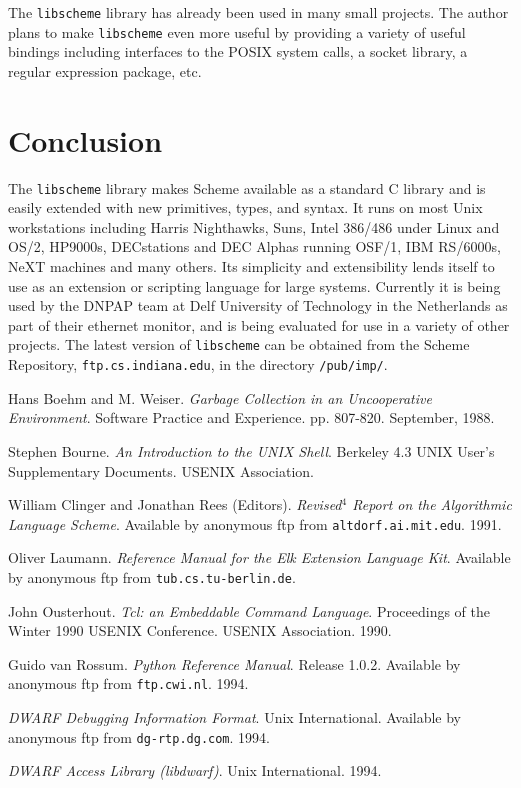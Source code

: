 The \verb+libscheme+ library has already been used in many small
projects.  The author plans to make \verb+libscheme+ even more useful
by providing a variety of useful bindings including interfaces to the
POSIX system calls, a socket library, a regular expression package,
etc.

\section{Conclusion}

The \verb+libscheme+ library makes Scheme available as a standard C
library and is easily extended with new primitives, types, and syntax.
It runs on most Unix workstations including Harris Nighthawks, Suns,
Intel 386/486 under Linux and OS/2, HP9000s, DECstations and DEC
Alphas running OSF/1, IBM RS/6000s, NeXT machines and many others.
Its simplicity and extensibility lends itself to use as an extension
or scripting language for large systems.  Currently it is being used
by the DNPAP team at Delf University of Technology in the Netherlands
as part of their ethernet monitor, and is being evaluated for use in a
variety of other projects.  The latest version of \verb+libscheme+ can
be obtained from the Scheme Repository, \verb+ftp.cs.indiana.edu+, in
the directory \verb+/pub/imp/+.

\begin{thebibliography}{99}

 Hans Boehm and M. Weiser.  {\em Garbage Collection
    in an Uncooperative Environment\/}.  Software Practice and
  Experience.  pp. 807-820.  September, 1988.

 Stephen Bourne.  {\em An Introduction to the UNIX
    Shell\/}.  Berkeley 4.3 UNIX User's Supplementary Documents.  USENIX
  Association. 

 William Clinger and Jonathan Rees (Editors).
  {\em Revised\/$^4$ Report on the Algorithmic Language Scheme\/}.
  Available by anonymous ftp from \verb+altdorf.ai.mit.edu+.  1991.

  Oliver Laumann.  {\em Reference Manual for the Elk
    Extension Language Kit\/}.  Available by anonymous ftp from
  \verb+tub.cs.tu-berlin.de+.

 John Ousterhout.  {\em Tcl: an Embeddable Command
    Language\/}.  Proceedings of the Winter 1990 USENIX Conference.
  USENIX Association.  1990.

 Guido van Rossum.  {\em Python Reference
    Manual\/}.  Release 1.0.2.  Available by anonymous ftp from
  \verb+ftp.cwi.nl+.  1994.

 {\em DWARF Debugging Information Format\/}.  Unix
  International.  Available by anonymous ftp from
  \verb+dg-rtp.dg.com+.  1994.

 {\em DWARF Access Library (libdwarf)\/}.  Unix
  International.  1994.

\end{thebibliography}

